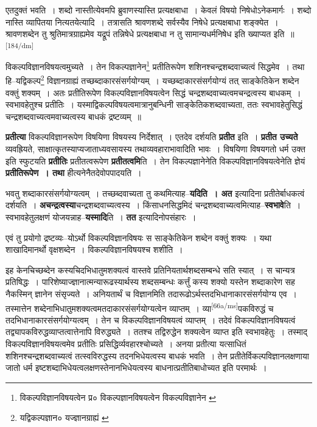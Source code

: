 \documentclass[article,12pt,a4paper]{memoir}
\begin{document}
	  \pstart एतदुक्तं भवति । शब्दो नास्तीत्येवमपि ब्रुवाणस्यास्ति प्रत्यक्षबाधा । केवलं विषयो निषेधोऽनेकमार्गः । शब्दो नास्ति व्यापितया नित्यतयेत्यादि । तत्रासति श्रावणशब्दे सर्वस्यैव निषेधे प्रत्यक्षबाधा शङ्क्येत । श्रावणशब्देन तु श्रुतिमात्रग्राह्यमेव यद्रूपं तन्निषेधे प्रत्यक्षबाधा न तु सामान्यधर्मनिषेध इति ख्याप्यत इति ॥
	\pend
      \leavevmode\textsuperscript{\rmlatinfont\tiny [184/dm]}

	  \pstart विकल्पविज्ञानविषयत्वमुच्यते । तेन विकल्पज्ञानेन\footnote{विकल्पविज्ञानविषयत्वेन प्र० \cite{dp-msB} \cite{dp-edP} \cite{dp-edH} \cite{dp-edE} विकल्पज्ञानविषयत्वेन \cite{dp-msC} \cite{dp-msD} विकल्पविज्ञानेन \cite{dp-msA}} प्रतीतिरूपेण शशिनश्चन्द्रशब्दवाच्यत्वं सिद्धमेव । तथा हि--यद्विकल्प\footnote{यद्विकल्पज्ञान० \cite{dp-msB} \cite{dp-edP} \cite{dp-edH} \cite{dp-edN} यज्ज्ञानग्राह्यं \cite{dp-msA}} विज्ञानग्राह्यं तच्छब्दाकारसंसर्गयोग्यम् । यच्छब्दाकारसंसर्गयोग्यं तत् साङ्केतिकेन शब्देन वक्तुं शक्यम् । अतः प्रतीतिरूपेण विकल्पविज्ञानविषयत्वेन सिद्धं चन्द्रशब्दवाच्यत्वमचन्द्रत्वस्य बाधकम् । स्वभावहेतुश्च प्रतीतिः । यस्माद्विकल्पविषयत्वमात्रानुबन्धिनी साङ्केतिकशब्दवाच्यता, ततः स्वभावहेतुसिद्धं चन्द्रशब्दवाच्यत्वमवाच्यत्वस्य बाधकं द्रष्टव्यम् ॥
	\pend
      

	  \pstart \textbf{प्रतीत्या} विकल्पविज्ञानरूपेण विषयिणा विषयस्य निर्देशात् । एतदेव दर्शयति \textbf{प्रतीत} इति । \textbf{प्रतीत उच्यते} व्यवह्रियते, साक्षात्कृतस्याप्यजाताध्यवसायस्य तथाव्यवहाराभावादिति भावः । विषयिणा विषयगतो धर्म उक्त इति स्फुटयति \textbf{प्रतीतिः} प्रतीतत्वरूपेण \textbf{प्रतीतत्वमि}ति । तेन विकल्पज्ञानेनेति विकल्पविज्ञानविषयत्वेनेति ज्ञेयं \textbf{प्रतीतिरूपेण । तथा} हीत्यनेनैतदेवोपपादयति ।
	\pend
      

	  \pstart भवतु शब्दाकारसंसर्गयोग्यत्वम् । तच्छब्दवाच्यता तु कथमित्याह--\textbf{यदिति । अत} इत्यादिना प्रतीतेर्बाधकत्वं दर्शयति । \textbf{अचन्द्रत्वस्या}चन्द्रशब्दवाच्यत्वस्य । किंसाधनसिद्धमिदं चन्द्रशब्दवाच्यत्वमित्याह--\textbf{स्वभावे}ति । स्वभावहेतुलक्षणं योजयन्नाह--\textbf{यस्मादि}ति । \textbf{तत} इत्यादिनोपसंहारः ।
	\pend
      

	  \pstart एवं तु प्रयोगो द्रष्टव्यः--योऽर्थो विकल्पविज्ञानविषयः स साङ्केतिकेन शब्देन वक्तुं शक्यः । यथा शाखादिमानर्थो वृक्षशब्देन । विकल्पविज्ञानविषयश्च शशीति ।
	\pend
      

	  \pstart इह केनचिच्छब्देन कस्यचिदभिधातुमशक्यत्वं वास्तवे प्रतिनियतार्थशब्दसम्बन्धे सति स्यात् । स चान्यत्र प्रतिषिद्धः । पारिशेष्याज्ज्ञानात्मन्यारूढस्यार्थस्य शब्दसम्बन्धः कर्त्तुं कस्य शक्यो यस्तेन शब्दाकारेण सह नैकस्मिन् ज्ञानेन संसृज्यते । अनियतार्थं च विज्ञानमिति तदारूढोऽर्थस्तदभिधानाकारसंसर्गयोग्य एव । तस्मात्तेन शब्देनाभिधातुमशक्यत्वमतदाकारसंसर्गयोग्यत्वेन व्याप्तम् । व्या\leavevmode\textsuperscript{\rmlatinfont\tiny [66a/ms]}पकविरुद्धं च तदभिधानाकारसंसर्गयोग्यत्वम् । तेन च विकल्पविज्ञानविषयत्वं व्याप्तम् । तदेवं विकल्पविज्ञानविषयत्वं तद्व्यापकविरुद्धव्याप्तत्वात्तेनापि विरुद्ध्यते । ततश्च तद्विरुद्धेन शक्यत्वेन व्याप्त इति स्वभावहेतुः । तस्माद् विकल्पविज्ञानविषयत्वमेव प्रतीतिः प्रसिद्धिर्व्यवहारश्चोच्यते । अनया प्रतीत्या यत्साधितं शशिनश्चन्द्रशब्दवाच्यत्वं तत्स्वविरुद्धस्य तदनभिधेयत्वस्य बाधकं भवति । तेन प्रतीतेर्विकल्पविज्ञानलक्षणाया जातो धर्म इष्टशब्दाभिधेयत्वलक्षणस्तेनानभिधेयत्वस्य बाधनात्प्रतीतिबाधोच्यत इति परमार्थः ।
	\pend
      
\end{document}
